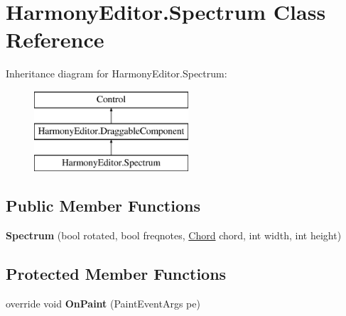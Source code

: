 \hypertarget{class_harmony_editor_1_1_spectrum}{\section{Harmony\+Editor.\+Spectrum Class Reference}
\label{class_harmony_editor_1_1_spectrum}
}
Inheritance diagram for Harmony\+Editor.\+Spectrum\+:\begin{figure}[H]
\begin{center}
\leavevmode
\includegraphics[height=3.000000cm]{class_harmony_editor_1_1_spectrum}
\end{center}
\end{figure}
\subsection*{Public Member Functions}
\begin{DoxyCompactItemize}
\item 
\hypertarget{class_harmony_editor_1_1_spectrum_a26ee8eba598ed569eb1e363b6676328c}{{\bfseries Spectrum} (bool rotated, bool freqnotes, \hyperlink{class_periodic_chords_1_1_chord}{Chord} chord, int width, int height)}\label{class_harmony_editor_1_1_spectrum_a26ee8eba598ed569eb1e363b6676328c}

\end{DoxyCompactItemize}
\subsection*{Protected Member Functions}
\begin{DoxyCompactItemize}
\item 
\hypertarget{class_harmony_editor_1_1_spectrum_aa6e1f0f21ee8671f5f32e785b7b4d076}{override void {\bfseries On\+Paint} (Paint\+Event\+Args pe)}\label{class_harmony_editor_1_1_spectrum_aa6e1f0f21ee8671f5f32e785b7b4d076}

\end{DoxyCompactItemize}
